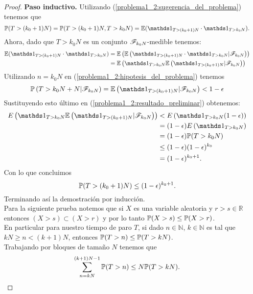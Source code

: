 \begin{proof}
	\textbf{Paso inductivo.} 
	Utilizando (\ref{problema1_2:sugerencia_del_problema}) tenemos que
		\begin{align}
			\mw(T>(k_0+1)N) = \mw(T>(k_0+1)N, T>k_0N) = \E(\indic_{T>(k_0+1)N} \cdot \indic_{T>k_0N}).
		\end{align}
	Ahora, dado que $T>k_0N$ es un conjunto $\mathscr{F}_{k_0N}$-medible tenemos:
	\begin{align} 
		\E(\indic_{T>(k_0+1)N} \cdot \indic_{T>k_0N}) 	&=		\E\left(\E\left(\indic_{T>(k_0+1)N} \cdot \indic_{T>k_0N} | \F_{k_0N}\right)\right) \\ 
														&=		\E\left(\indic_{T>k_0N} \E\left(\indic_{T>(k_0+1)N}|\F_{k_0N}\right)\right) \label{problema1_2:resultado_preliminar}
	\end{align}
	Utilizando  $n=k_0N$ en (\ref{problema1_2:hipotesis_del_problema}) tenemos
	\begin{align}
		\mw\left(T>k_0N+N|\F_{k_0N}\right) = \E\left(\indic_{T>(k_0+1)N}|\F_{k_0N}\right) < 1-\epsilon
	\end{align}
	Sustituyendo esto último en (\ref{problema1_2:resultado_preliminar}) obtenemos:
	\begin{align}
			 E\left(\indic_{T>k_0N} \E\left(\indic_{T>(k_0+1)N}|\F_{k_0N}\right)\right) 	&< 		E\left(\indic_{T>k_0N} (1-\epsilon)\right) \\
																							&=	 	(1-\epsilon) E\left(\indic_{T>k_0N} \right) \\
																							&=		(1-\epsilon) \mw(T>k_0N) \\
																							&\leq   (1-\epsilon)(1-\epsilon)^{k_0} \\
																							&= (1-\epsilon)^{k_0 + 1}.
	\end{align}
	Con lo que concluimos
		$$\mathbb{P}(T>(k_0+1)N) \leq (1-\epsilon)^{k_0 + 1}.$$
	Terminando así la demostración por inducción.\\
	
	
	Para la siguiente prueba notemos que si $X$ es una variable aleatoria y $r > s \in \mathbb{R}$ entonces
	$(X > s) \subset (X > r)$ y por lo tanto $\mathbb{P}(X > s) \leq \mathbb{P}(X > r)$.\\
	
	En particular para nuestro tiempo de paro $T$, si dado $n \in \mathbb{N}$, $k \in \mathbb{N}$ es tal que 
	$kN \geq n < (k+1)N$, entonces $\mathbb{P}(T > n) \leq \mathbb{P}(T > kN)$.\\	

	Trabajando por bloques de tamaño $N$ tenemos que 
	\begin{align}
		\sum_{n = kN}^{(k+1)N -1} \mathbb{P}(T > n) \leq N \mathbb{P}(T > kN).
	\end{align}		
	

\end{proof}
